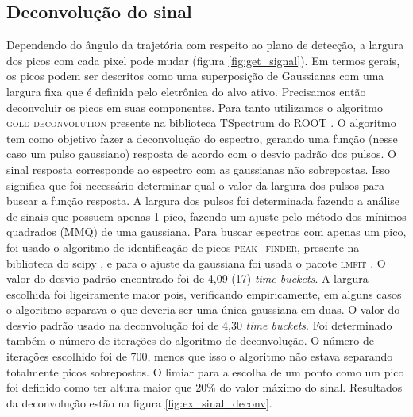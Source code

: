 \documentclass[a4paper,12pt,oneside]{book}
\begin{document}
\subsection{Deconvolução do sinal}\label{subsec:pulses_deconv}


\par Dependendo do ângulo da trajetória com respeito ao plano de detecção, a largura dos picos com cada pixel pode mudar (figura \ref{fig:get_signal}). Em termos gerais, os picos podem ser descritos como uma superposição de Gaussianas com uma largura fixa que é definida pelo eletrônica do alvo ativo. Precisamos então deconvoluir os picos em suas componentes. Para tanto utilizamos o algoritmo \textsc{gold deconvolution} presente na biblioteca TSpectrum do ROOT \cite{paper_gold_deconv}. O algoritmo tem como objetivo fazer a deconvolução do espectro, gerando uma função (nesse caso um pulso gaussiano) resposta de acordo com o desvio padrão dos pulsos. O sinal resposta corresponde ao espectro com as gaussianas não sobrepostas. Isso significa que foi necessário determinar qual o valor da largura dos pulsos para buscar a função resposta. A largura dos pulsos foi determinada fazendo a análise de sinais que possuem apenas 1 pico, fazendo um ajuste pelo método dos mínimos quadrados (MMQ) de uma gaussiana. Para buscar espectros com apenas um pico, foi usado o algoritmo de identificação de picos \textsc{peak\_finder}, presente na biblioteca do scipy \cite{scipy}, e para o ajuste da gaussiana foi usada o pacote \textsc{lmfit} \cite{lmfit}. O valor do desvio padrão encontrado foi de 4,09 (17) \textit{time buckets}. A largura escolhida foi ligeiramente maior pois, verificando empiricamente, em alguns casos o algoritmo separava o que deveria ser uma única gaussiana em duas. O valor do desvio padrão usado na deconvolução foi de 4,30 \textit{time buckets}. Foi determinado também o número de iterações do algoritmo de deconvolução. O número de iterações escolhido foi de 700, menos que isso o algoritmo não estava separando totalmente picos sobrepostos. O limiar para a escolha de um ponto como um pico foi definido como ter altura maior que 20\% do valor máximo do sinal. Resultados da deconvolução estão na figura \ref{fig:ex_sinal_deconv}.
\end{document}
